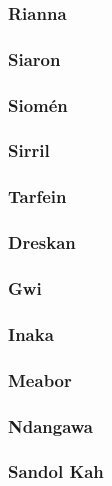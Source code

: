 \documentclass[../main.tex]{subfiles}
\begin{document}
\subsubsection{Rianna}
\label{sec:rianna}

\subsubsection{Siaron}
\label{sec:siaron}

\subsubsection{Siomén}
\label{sec:siomen}

\subsubsection{Sirril}
\label{sec:sirril}

\subsubsection{Tarfein}
\label{sec:tarfein}

\subsubsection{Dreskan}
\label{sec:dreskan}

\subsubsection{Gwi}
\label{sec:gwi}

\subsubsection{Inaka}
\label{sec:inaka}

\subsubsection{Meabor}
\label{sec:meabor}

\subsubsection{Ndangawa}
\label{sec:ndangawa}

\subsubsection{Sandol Kah}
\label{sec:sandol-kah}
\end{document}
